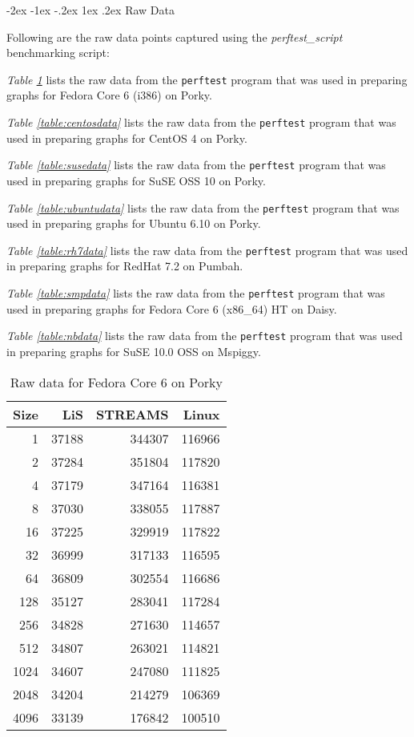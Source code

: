 \documentclass[letterpaper,final,notitlepage,twocolumn,10pt,twoside]{article}
\makeatletter
\renewcommand\section{\@startsection {section}{1}{\z@}%
                                   {-2ex \@plus -1ex \@minus -.2ex}%
                                   {1ex \@plus .2ex}%
                                   {\normalfont\large\bfseries}}
\makeatother
\begin{document}
\begin{appendix}
\section{Raw Data}
\label{section:rawdata}

Following are the raw data points captured using the \textsl{perftest\_script}
benchmarking script:

\textit{Table \ref{table:fc6data}} lists the raw data from the
\texttt{perftest} program that was used in preparing graphs for Fedora Core 6
(i386) on Porky.

\textit{Table \ref{table:centosdata}} lists the raw data from the
\texttt{perftest} program that was used in preparing graphs for CentOS 4 on
Porky.

\textit{Table \ref{table:susedata}} lists the raw data from the
\texttt{perftest} program that was used in preparing graphs for SuSE OSS 10 on
Porky.

\textit{Table \ref{table:ubuntudata}} lists the raw data from the
\texttt{perftest} program that was used in preparing graphs for Ubuntu 6.10 on
Porky.

\textit{Table \ref{table:rh7data}} lists the raw data from the
\texttt{perftest} program that was used in preparing graphs for RedHat 7.2 on
Pumbah.

\textit{Table \ref{table:smpdata}} lists the raw data from the
\texttt{perftest} program that was used in preparing graphs for Fedora Core 6
(x86\_64) HT on Daisy.

\textit{Table \ref{table:nbdata}} lists the raw data from the
\texttt{perftest} program that was used in preparing graphs for SuSE 10.0 OSS
on Mspiggy.

\begin{table}[hp]
\footnotesize
\center\begin{tabular}{rrrr}\\
\hline
Size & LiS & STREAMS & Linux\\
\hline
\hline
1 & 37188 & 344307 & 116966\\
2 & 37284 & 351804 & 117820\\
4 & 37179 & 347164 & 116381\\
8 & 37030 & 338055 & 117887\\
16 & 37225 & 329919 & 117822\\
32 & 36999 & 317133 & 116595\\
64 & 36809 & 302554 & 116686\\
128 & 35127 & 283041 & 117284\\
256 & 34828 & 271630 & 114657\\
512 & 34807 & 263021 & 114821\\
1024 & 34607 & 247080 & 111825\\
2048 & 34204 & 214279 & 106369\\
4096 & 33139 & 176842 & 100510\\
\hline
\end{tabular}
\caption{Raw data for Fedora Core 6 on Porky}
\label{table:fc6data}
\normalsize
\end{table}


\end{appendix}
\end{document}
